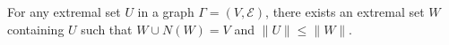 For any extremal set $U$ in a graph $\Gamma = (V, \mathcal{E})$, there exists an extremal set $W$ containing $U$ such that $W \cup N(W) = V$ and $\|U\| \leq \|W\|$.
